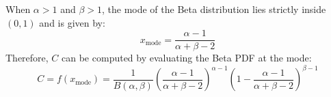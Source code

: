 When \(\alpha > 1\) and \(\beta > 1\), the mode of the Beta distribution lies strictly inside \((0,1)\) and is given by:
\begin{equation}
x_{\text{mode}} = \frac{\alpha - 1}{\alpha + \beta - 2}
\end{equation}
Therefore, \(C\) can be computed by evaluating the Beta PDF at the mode:
\begin{equation}
C = f(x_{\text{mode}}) = \frac{1}{B(\alpha, \beta)} \left(\frac{\alpha - 1}{\alpha + \beta - 2}\right)^{\alpha - 1} \left(1 - \frac{\alpha - 1}{\alpha + \beta - 2}\right)^{\beta - 1}
\end{equation}











